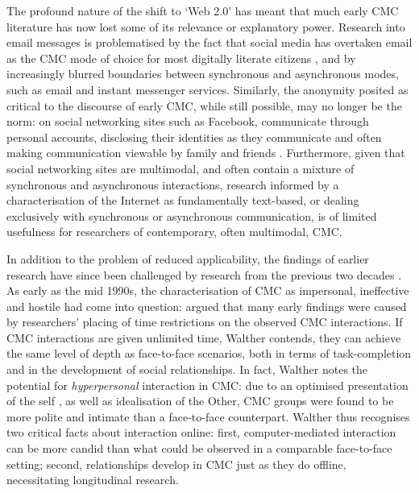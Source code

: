 The profound nature of the shift to `Web 2.0' has meant that much early \gls{CMC} literature has now lost some of its relevance or explanatory power. Research into email messages is problematised by the fact that social media has overtaken email as the \gls{CMC} mode of choice for most digitally literate citizens \cite{thorne_computer-mediated_2008}, and by increasingly blurred boundaries between synchronous and asynchronous \glspl{mode}, such as email and instant messenger services. Similarly, the anonymity posited as critical to the discourse of early \gls{CMC}, while still possible, may no longer be the norm: on social networking sites such as Facebook,  communicate through personal accounts, disclosing their identities as they communicate and often making communication viewable by family and friends \cite{boyd_social_2007}. Furthermore, given that social networking sites are multimodal, and often contain a mixture of synchronous and asynchronous interactions, research informed by a characterisation of the Internet as fundamentally text\hyp{}based, or dealing exclusively with synchronous or asynchronous communication, is of limited usefulness for researchers of contemporary, often multimodal, \gls{CMC}.

In addition to the problem of reduced applicability, the findings of earlier research have since been challenged by research from the previous two decades \cite{herring_computer-mediated_2001,postmes_formation_2000}. As early as the mid 1990s, the characterisation of \gls{CMC} as impersonal, ineffective and hostile had come into question: \textcite{walther_computer-mediated_1996} argued that many early findings were caused by researchers' placing of time restrictions on the observed \gls{CMC} interactions. If \gls{CMC} interactions are given unlimited time, Walther contends, they can achieve the same level of depth as face\hyp{}to\hyp{}face scenarios, both in terms of task\hyp{}completion and in the development of social relationships. In fact, Walther notes the potential for \emph{hyperpersonal} interaction in CMC: due to an optimised presentation of the self \cite[now often called \emph{self\hyp{}curation}; see][]{van_kleek_self_2015}, as well as idealisation of the Other, \gls{CMC} groups were found to be more polite and intimate than a face\hyp{}to\hyp{}face counterpart. Walther thus recognises two critical facts about interaction online: first, computer\hyp{}mediated interaction can be more candid than what could be observed in a comparable face\hyp{}to\hyp{}face setting; second, relationships develop in \gls{CMC} just as they do offline, necessitating longitudinal research. 

